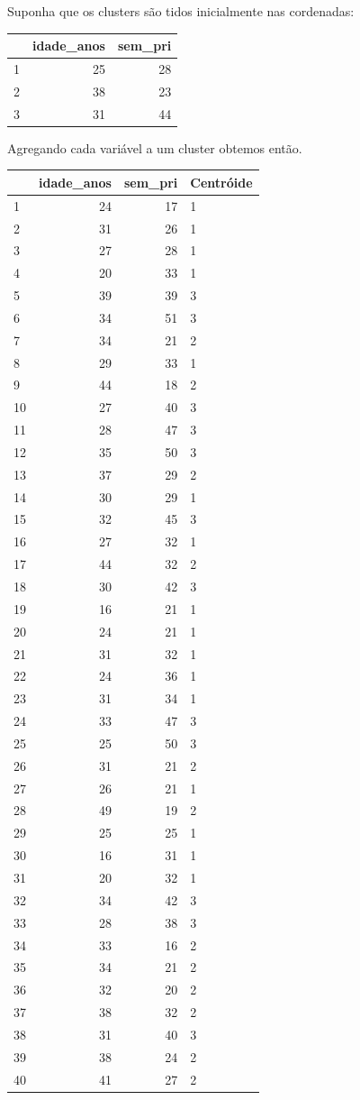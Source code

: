 \documentclass[
  letterpaper,
  DIV=11,
  numbers=noendperiod]{scrreprt}
\begin{document}
Suponha que os clusters são tidos inicialmente nas cordenadas:

\begin{longtable}[]{@{}lrr@{}}
\toprule()
& idade\_anos & sem\_pri \\
\midrule()
\endhead
1 & 25 & 28 \\
2 & 38 & 23 \\
3 & 31 & 44 \\
\bottomrule()
\end{longtable}

Agregando cada variável a um cluster obtemos então.

\begin{longtable}[]{@{}lrrl@{}}
\toprule()
& idade\_anos & sem\_pri & Centróide \\
\midrule()
\endhead
1 & 24 & 17 & 1 \\
2 & 31 & 26 & 1 \\
3 & 27 & 28 & 1 \\
4 & 20 & 33 & 1 \\
5 & 39 & 39 & 3 \\
6 & 34 & 51 & 3 \\
7 & 34 & 21 & 2 \\
8 & 29 & 33 & 1 \\
9 & 44 & 18 & 2 \\
10 & 27 & 40 & 3 \\
11 & 28 & 47 & 3 \\
12 & 35 & 50 & 3 \\
13 & 37 & 29 & 2 \\
14 & 30 & 29 & 1 \\
15 & 32 & 45 & 3 \\
16 & 27 & 32 & 1 \\
17 & 44 & 32 & 2 \\
18 & 30 & 42 & 3 \\
19 & 16 & 21 & 1 \\
20 & 24 & 21 & 1 \\
21 & 31 & 32 & 1 \\
22 & 24 & 36 & 1 \\
23 & 31 & 34 & 1 \\
24 & 33 & 47 & 3 \\
25 & 25 & 50 & 3 \\
26 & 31 & 21 & 2 \\
27 & 26 & 21 & 1 \\
28 & 49 & 19 & 2 \\
29 & 25 & 25 & 1 \\
30 & 16 & 31 & 1 \\
31 & 20 & 32 & 1 \\
32 & 34 & 42 & 3 \\
33 & 28 & 38 & 3 \\
34 & 33 & 16 & 2 \\
35 & 34 & 21 & 2 \\
36 & 32 & 20 & 2 \\
37 & 38 & 32 & 2 \\
38 & 31 & 40 & 3 \\
39 & 38 & 24 & 2 \\
40 & 41 & 27 & 2 \\
\bottomrule()
\end{longtable}
\end{document}
